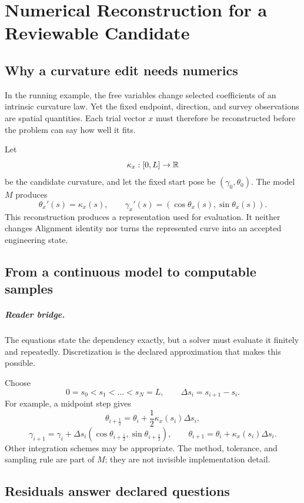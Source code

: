 \chapter{Numerical Reconstruction for a Reviewable Candidate}

\section{Why a curvature edit needs numerics}

In the running example, the free variables change selected coefficients of an
intrinsic curvature law. Yet the fixed endpoint, direction, and survey
observations are spatial quantities. Each trial vector \(x\) must therefore be
reconstructed before the problem can say how well it fits.

Let
\[
\kappa_x:[0,L]\rightarrow\mathbb{R}
\]
be the candidate curvature, and let the fixed start pose be
\((\gamma_0,\theta_0)\). The model \(M\) produces
\[
\theta_x'(s)=\kappa_x(s),\qquad
\gamma_x'(s)=(\cos\theta_x(s),\sin\theta_x(s)).
\]
This reconstruction produces a representation used for evaluation. It neither
changes Alignment identity nor turns the represented curve into an accepted
engineering state.

\section{From a continuous model to computable samples}

\paragraph{Reader bridge.}
The equations state the dependency exactly, but a solver must evaluate it
finitely and repeatedly. Discretization is the declared approximation that
makes this possible.

Choose
\[
0=s_0<s_1<\dots<s_N=L,\qquad \Delta s_i=s_{i+1}-s_i .
\]
For example, a midpoint step gives
\[
\theta_{i+\frac12}=\theta_i+
 \frac12\kappa_x(s_i)\Delta s_i,
\]
\[
\gamma_{i+1}=\gamma_i+\Delta s_i
(\cos\theta_{i+\frac12},\sin\theta_{i+\frac12}),\qquad
\theta_{i+1}=\theta_i+\kappa_x(s_i)\Delta s_i.
\]
Other integration schemes may be appropriate. The method, tolerance, and
sampling rule are part of \(M\); they are not invisible implementation detail.

\section{Residuals answer declared questions}

